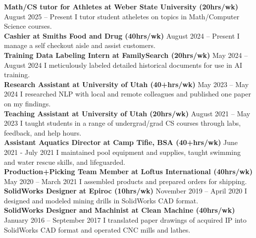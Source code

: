 \documentclass[a4paper,10pt]{article}
\newcommand{\resumeSection}[1]{\vspace{2pt}\noindent{\Large \textbf{#1}}\vspace{1pt}\newline}
\newcommand{\resumeSubsection}[2]{\noindent\textbf{#1} \hfill #2\newline}
\begin{document}
\resumeSection{Work Experience}
    \resumeSubsection{Math/CS tutor for Athletes at Weber State University (20hrs/wk)}{August 2025 -- Present}
        \indent I tutor student atheletes on topics in Math/Computer Science courses. \\
    \resumeSubsection{Cashier at Smiths Food and Drug (40hrs/wk)}{August 2024 -- Present}
        \indent I manage a self checkout aisle and assist customers. \\
    \resumeSubsection{Training Data Labeling Intern at FamilySearch (20hrs/wk)}{May 2024 -- August 2024}
        \indent I meticulously labeled detailed historical documents for use in AI training. \\
    \resumeSubsection{Research Assistant at University of Utah (40+hrs/wk)}{May 2023 -- May 2024}
        \indent I researched NLP with local and remote colleagues and published one paper on my findings. \\
    \resumeSubsection{Teaching Assistant at University of Utah (20hrs/wk)}{August 2021 -- May 2023}
        \indent I taught students in a range of undergrad/grad CS courses through labs, feedback, and help hours. \\
    \resumeSubsection{Assistant Aquatics Director at Camp Tifie, BSA (40+hrs/wk)}{June 2021 - July 2021}
        \indent I maintained pool equipment and supplies, taught swimming and water rescue skills, and lifeguarded. \\
    \resumeSubsection{Production+Picking Team Member at Loftus International (40hrs/wk)}{May 2020 -- March 2021}
        \indent I assembled products and prepared orders for shipping. \\
    \resumeSubsection{SolidWorks Designer at Epiroc (10hrs/wk)}{November 2019 -- April 2020}    
        \indent I designed and modeled mining drills in SolidWorks CAD format. \\
    \resumeSubsection{SolidWorks Designer and Machinist at Clean Machine (40hrs/wk)}{January 2016 -- September 2017}
        \indent I translated paper drawings of acquired IP into SolidWorks CAD format and operated CNC mills and lathes. \\
\end{document}
